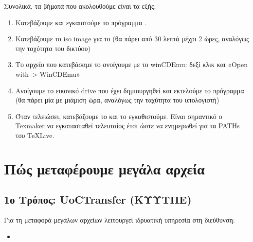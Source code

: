 \documentclass[letterpaper,10pt,greek]{sphinxhowto}
\begin{document}
\sphinxAtStartPar
Συνολικά, τα βήματα που ακολουθούμε είναι τα εξής:
\begin{enumerate}
%
\item {} 
\sphinxAtStartPar
Κατεβάζουμε και εγκαιστούμε το πρόγραμμα .

\item {} 
\sphinxAtStartPar
Κατεβάζουμε το iso image για το  (θα πάρει από 30 λεπτά μέχρι 2 ώρες, αναλόγως την ταχύτητα του δικτύου)

\item {} 
\sphinxAtStartPar
Το αρχείο που κατεβάσαμε το ανοίγουμε με το winCDEmu: δεξί κλικ και «Open with–> WinCDEmu»

\item {} 
\sphinxAtStartPar
Ανοίγουμε το εικονικό drive που έχει δημιουργηθεί και εκτελούμε το πρόγραμμα  (θα πάρει μία με μιάμιση ώρα, αναλόγως την ταχύτητα του υπολογιστή)

\item {} 
\sphinxAtStartPar
Όταν τελειώσει, κατεβάζουμε το  και το εγκαθιστούμε. Είναι σημαντικό ο Texmaker να εγκατασταθεί τελευταίος έτσι ώστε να ενημερωθεί για τα PATHs του TeXLive.

\end{enumerate}

\sphinxstepscope


\section{Πώς μεταφέρουμε μεγάλα αρχεία}
\label{\detokenize{HowToTransfer:id1}}\label{\detokenize{HowToTransfer::doc}}

\subsection{1ο Τρόπος: UoCTransfer (ΚΥΥΤΠΕ)}
\label{\detokenize{HowToTransfer:uoctransfer}}
\sphinxAtStartPar
Για τη μεταφορά μεγάλων αρχείων λειτουργεί ιδρυατική
υπηρεσία στη διεύθυνση:
\begin{itemize}
\item {} 
\sphinxAtStartPar
{}

\end{itemize}
\end{document}
